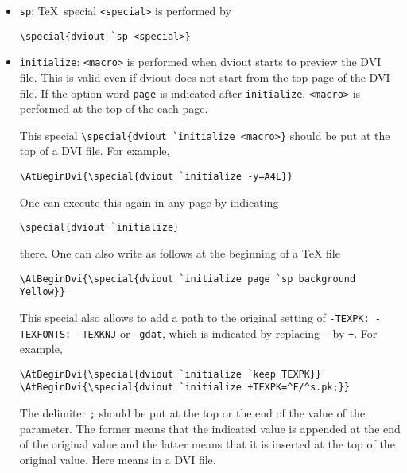 \documentclass{article}
\begin{document}
\begin{itemize}
- If {\tt [CTRL]} is pressed under the click, the key word is copied to an editor 
and the clipboard.  The editor is determined at this first click.

- If {\tt [CTRL]+[ALT]} are pressed under the click, the key word is copied 
to a new editor and the clipboard.

This is an application of this dviout special and it is easily extended since
the source file of this Help is in the package of {\tt dviout}.

\item {\tt sp}: \TeX\ special {\tt <special>} is performed by
\begin{verbatim}
\special{dviout `sp <special>}
\end{verbatim}

\item {\tt initialize}: {\tt <macro>} is performed when dviout starts to
preview the DVI file.  This is valid even if dviout does not start from
the top page of the DVI file.
If the option word {\tt page} is indicated after {\tt initialize}, 
{\tt <macro>} is performed at the top of the each page. 

This special \verb|\special{dviout `initialize <macro>}| should be put 
at the top of a DVI file.  For example,
\begin{verbatim}
\AtBeginDvi{\special{dviout `initialize -y=A4L}}
\end{verbatim}
One can execute this again in any page by indicating
\begin{verbatim}
\special{dviout `initialize}
\end{verbatim}
there.
One can also write as follows at the beginning of a TeX file
\begin{verbatim}
\AtBeginDvi{\special{dviout `initialize page `sp background 
Yellow}}
\end{verbatim}

This special also allows to add a path to the original setting of
{\tt -TEXPK:}\ {\tt-TEXFONTS:}\ {\tt-TEXKNJ} or {\tt-gdat},
which is indicated by replacing {\tt -} by {\tt +}.
For example,
\begin{verbatim}
\AtBeginDvi{\special{dviout `initialize `keep TEXPK}}
\AtBeginDvi{\special{dviout `initialize +TEXPK=^F/^s.pk;}}
\end{verbatim}
The delimiter {\tt ;} should be put at the top or the end of the value
of the parameter.  The former means that the indicated value is 
appended at the end of the original value and the latter means that 
it is inserted at the top of the original value.
Here  means  in 
a DVI file.


\end{itemize}
\end{document}

